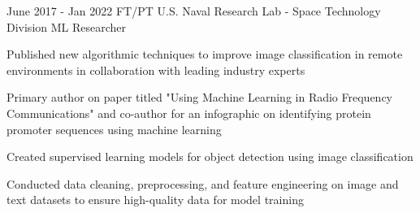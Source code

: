\documentclass[
	12pt, %
]{FreemanCV}
\begin{document}
{		%
	} 





\jobentry
	{June 2017 - Jan 2022} %
	{FT/PT} %
	{U.S. Naval Research Lab - Space Technology Division} %
	{ML Researcher} %
	{ %
		\item Published new algorithmic techniques to improve image classification in remote environments in collaboration with leading industry experts
		\item Primary author on paper titled "Using Machine Learning in Radio Frequency Communications" and co-author for an infographic on identifying protein promoter sequences using machine learning
		\item Created supervised learning models for object detection using image classification
		\item Conducted data cleaning, preprocessing, and feature engineering on image and text datasets to ensure high-quality data for model training
	} 
	
\end{document}

